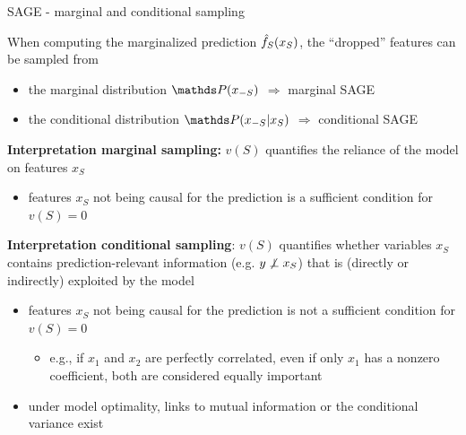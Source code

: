 \documentclass[11pt,compress,t,notes=noshow, aspectratio=169, xcolor=table]{beamer}
\begin{document}
\begin{frame}{SAGE - marginal and conditional sampling}

When computing the marginalized prediction $\fh_S(x_S)$, the ``dropped'' features can be sampled from \\
\begin{itemize}
\item the marginal distribution $\P(x_{-S})$ $\Rightarrow$ marginal SAGE
\item the conditional distribution $\P(x_{-S}|x_S)$ $\Rightarrow$ conditional SAGE
\end{itemize}



\lz\pause

\textbf{Interpretation marginal sampling:} $v(S)$ quantifies the reliance of the model on features $x_S$
\begin{itemize}
  \item features $x_S$ not being causal for the prediction is a sufficient condition for $v(S) = 0$
\end{itemize}

\lz\pause

\textbf{Interpretation conditional sampling}: $v(S)$ quantifies whether variables $x_S$ contains prediction-relevant information (e.g. $y \not \indep x_S$) that is (directly or indirectly) exploited by the model
\begin{itemize}
  \item features $x_S$ not being causal for the prediction is not a sufficient condition for $v(S) = 0$
  \begin{itemize}
      \item e.g., if $x_1$ and $x_2$ are perfectly correlated, even if only $x_1$ has a nonzero coefficient, both are considered equally important
  \end{itemize}
  \item under model optimality, links to mutual information or the conditional variance exist
\end{itemize}

\end{frame}
\end{document}
